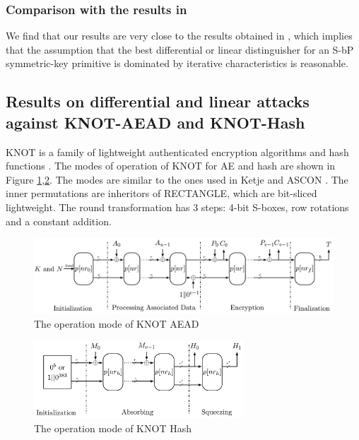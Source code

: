 \subsubsection{Comparison with the results in \cite{EPRINT:HalVej18}}

We find that our results are very close to the results obtained in \cite{EPRINT:HalVej18}, which implies that the assumption that the best differential or linear distinguisher for an S-bP symmetric-key primitive is dominated by iterative characteristics is reasonable. 

\subsection{Results on differential and linear attacks against KNOT-AEAD and KNOT-Hash}

KNOT is a family of lightweight authenticated encryption algorithms and hash functions \cite{zhang2019knot}. The modes of operation of KNOT for AE and hash are shown in Figure \ref{fig:mode_aead},\ref{fig:mode_hash}. The modes are similar to the ones used in Ketje \cite{bertoni2014ketje} and ASCON \cite{dobraunig2016ascon}. The inner permutations are inheritors of RECTANGLE, which are bit-sliced lightweight. The round transformation has 3 steps: 4-bit S-boxes, row rotations and a constant addition. 

\begin{figure}
	\centering
	\includegraphics[width=1\textwidth]{fig/mode_aead.PNG}
	\caption{The operation mode of KNOT AEAD} \label{fig:mode_aead}
\end{figure}

\begin{figure}
	\centering
	\includegraphics[width=0.7\textwidth]{fig/mode_hash.PNG}
	\caption{The operation mode of KNOT Hash} \label{fig:mode_hash}
\end{figure}

